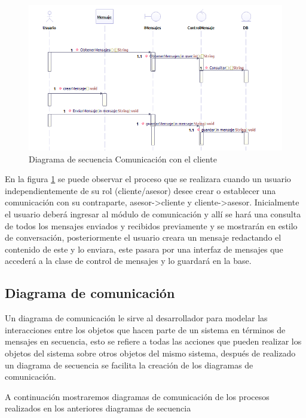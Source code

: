 \begin{figure}[th!]
	\centering
	\includegraphics[width=1.0\linewidth]{arquitectura/imagenes/DiagramaDeSecuenciaCC}
	\caption{Diagrama de secuencia Comunicación con el cliente}
	\label{img:secuenciacomcliente}
\end{figure}

En la figura \ref{img:secuenciacomcliente} se puede observar el proceso que se realizara cuando un usuario independientemente de su rol (cliente/asesor) desee crear o establecer una comunicación con su contraparte, asesor->cliente y cliente->asesor. Inicialmente el usuario deberá ingresar al módulo de comunicación y allí se hará una consulta de todos los mensajes enviados y recibidos previamente y se mostrarán en estilo de conversación, posteriormente el usuario creara un mensaje redactando el contenido de este y lo enviara, este pasara por una interfaz de mensajes que accederá a la clase de control de mensajes y lo guardará en la base.

\subsection{Diagrama de comunicación}
Un diagrama de comunicación le sirve al desarrollador para modelar las interacciones entre los objetos que hacen parte de un sistema en términos de mensajes en secuencia, esto se refiere a todas las acciones que pueden realizar los objetos del sistema sobre otros objetos del mismo sistema, después de realizado un diagrama de secuencia se facilita la creación de los diagramas de comunicación.

A continuación mostraremos diagramas de comunicación de los procesos realizados en los anteriores diagramas de secuencia

